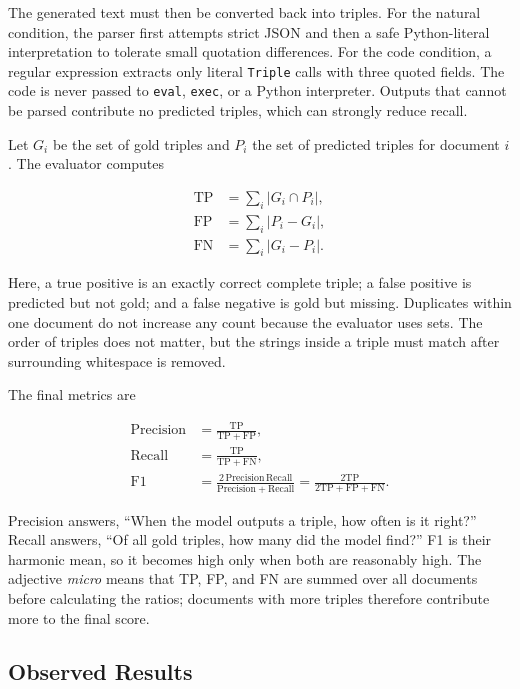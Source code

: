 \documentclass[11pt]{article}
\begin{document}
The generated text must then be converted back into triples. For the
natural condition, the parser first attempts strict JSON and then a safe
Python-literal interpretation to tolerate small quotation differences.
For the code condition, a regular expression extracts only literal
\texttt{Triple} calls with three quoted fields. The code is never passed
to \texttt{eval}, \texttt{exec}, or a Python interpreter. Outputs that
cannot be parsed contribute no predicted triples, which can strongly
reduce recall.

Let $G_i$ be the set of gold triples and $P_i$ the set of predicted
triples for document $i$. The evaluator computes

\begin{align*}
\mathrm{TP} &= \sum_i |G_i\cap P_i|,\\
\mathrm{FP} &= \sum_i |P_i-G_i|,\\
\mathrm{FN} &= \sum_i |G_i-P_i|.
\end{align*}

Here, a true positive is an exactly correct complete triple; a false
positive is predicted but not gold; and a false negative is gold but
missing. Duplicates within one document do not increase any count because
the evaluator uses sets. The order of triples does not matter, but the
strings inside a triple must match after surrounding whitespace is
removed.

The final metrics are

\begin{align*}
\mathrm{Precision} &= \frac{\mathrm{TP}}
  {\mathrm{TP}+\mathrm{FP}},\\
\mathrm{Recall} &= \frac{\mathrm{TP}}
  {\mathrm{TP}+\mathrm{FN}},\\
\mathrm{F1} &= \frac{2\,\mathrm{Precision}\,\mathrm{Recall}}
  {\mathrm{Precision}+\mathrm{Recall}}
  = \frac{2\mathrm{TP}}
  {2\mathrm{TP}+\mathrm{FP}+\mathrm{FN}}.
\end{align*}

Precision answers, ``When the model outputs a triple, how often is it
right?'' Recall answers, ``Of all gold triples, how many did the model
find?'' F1 is their harmonic mean, so it becomes high only when both are
reasonably high. The adjective \emph{micro} means that TP, FP, and FN are
summed over all documents before calculating the ratios; documents with
more triples therefore contribute more to the final score.

\subsection{Observed Results}
\label{implementation-observed-results}
\end{document}
